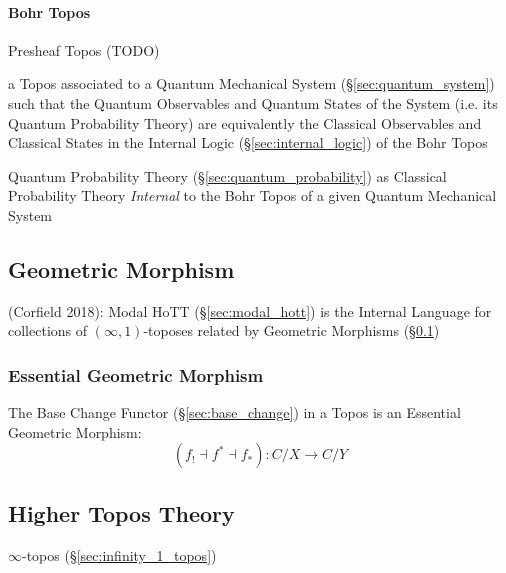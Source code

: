 \paragraph{Bohr Topos}\label{sec:bohr_topos}\hfill

Presheaf Topos (TODO)

a Topos associated to a Quantum Mechanical System (\S\ref{sec:quantum_system})
such that the Quantum Observables and Quantum States of the System (i.e. its
Quantum Probability Theory) are equivalently the Classical Observables and
Classical States in the Internal Logic (\S\ref{sec:internal_logic}) of the Bohr
Topos

Quantum Probability Theory (\S\ref{sec:quantum_probability}) as Classical
Probability Theory \emph{Internal} to the Bohr Topos of a given Quantum
Mechanical System



\subsection{Geometric Morphism}\label{sec:geometric_morphism}

(Corfield 2018): Modal HoTT (\S\ref{sec:modal_hott}) is the Internal Language
for collections of $(\infty,1)$-toposes related by Geometric Morphisms
(\S\ref{sec:geometric_morphism})



\subsubsection{Essential Geometric Morphism}
\label{sec:essential_geometric}

The Base Change Functor (\S\ref{sec:base_change}) in a Topos is an
Essential Geometric Morphism:
\[
  (f_! \dashv f^* \dashv f_*):C/X \rightarrow C/Y
\]



\subsection{Higher Topos Theory}\label{sec:higher_topos}

$\infty$-topos (\S\ref{sec:infinity_1_topos})

